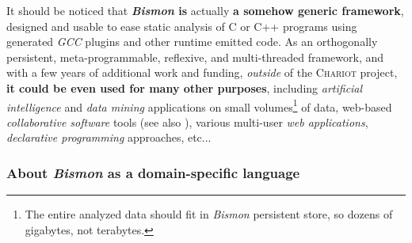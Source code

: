 \bigskip

It should be noticed that \textbf{\emph{Bismon} is} actually \textbf{a
  somehow generic framework},  designed and usable to
ease static analysis of C or C++ programs using generated \emph{GCC}
plugins and other runtime emitted code. As an orthogonally persistent,
meta-programmable, reflexive, and multi-threaded framework, and with a
few years of additional work and funding, \emph{outside} of the
\textsc{Chariot} project, \textbf{it could be even used for many other
  purposes}, including \emph{artificial intelligence} and \emph{data
  mining} applications on small volumes\footnote{The entire analyzed
  data should fit in \emph{Bismon} persistent store, so dozens of
  gigabytes, not terabytes.}  of data, web-based \emph{collaborative
  software} tools (see also \cite{echeverria:2019:collab-translucence,
  kou:2019:practice, gulay:2019:integ-workf, dragicevic:2019:ITR}),
various multi-user \emph{web applications}, \emph{declarative
  programming} approaches, etc... 
    
 

\medskip

\subsubsection{About \emph{Bismon} as a domain-specific language}
\label{subsubsec:bismon-dsl}

